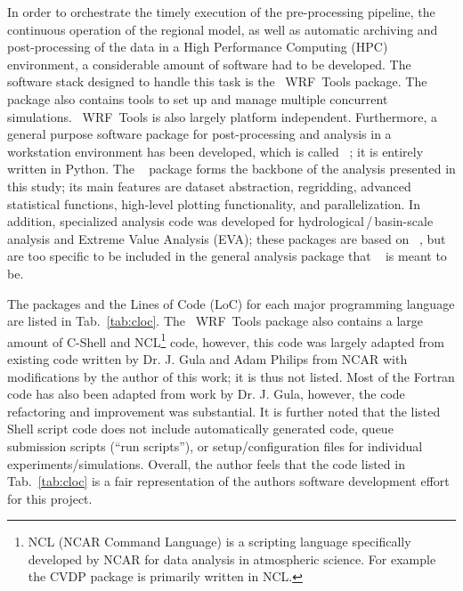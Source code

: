 \documentclass[letterpaper,12pt,headsepline,final]{scrartcl} %
\newcommand{\tab}[1]{Tab.~\ref{#1}}
\newcommand{\wrftools}{\mbox{\color{violet} \sffamily WRF~Tools}}
\newcommand{\geopy}{\mbox{\color{teal} \sffamily {GeoPy}}}
\begin{document}
In order to orchestrate the timely execution of the pre-processing pipeline, the continuous operation of the regional model, as well as automatic archiving and post-processing of the data in a High Performance Computing (HPC) environment, a considerable amount of software had to be developed. The software stack designed to handle this task is the \wrftools{} package.
The package also contains tools to set up and manage multiple concurrent simulations. \wrftools{} is also largely platform independent.
Furthermore, a general purpose software package for post-processing and analysis in a workstation environment has been developed, which is called \geopy{}; it is entirely written in Python. The \geopy{} package forms the backbone of the analysis presented in this study; its main features are dataset abstraction, regridding, advanced statistical functions, high-level plotting functionality, and parallelization.
In addition, specialized analysis code was developed for hydrological\,/\,basin-scale analysis and Extreme Value Analysis (EVA); these packages are based on \geopy{}, but are too specific to be included in the general analysis package that \geopy{} is meant to be.

The packages and the Lines of Code (LoC) for each major programming language are listed in \tab{tab:cloc}. The \wrftools{} package also contains a large amount of C-Shell and NCL\footnote{NCL (NCAR Command Language) is a scripting language specifically developed by NCAR for data analysis in atmospheric science. For example the CVDP package is primarily written in NCL.} code, however, this code was largely adapted from existing code written by Dr. J. Gula and Adam Philips from NCAR with modifications by the author of this work; it is thus not listed. Most of the Fortran code has also been adapted from work by Dr. J. Gula, however, the code refactoring and improvement was substantial.
It is further noted that the listed Shell script code does not include automatically generated code, queue submission scripts (``run scripts''), or setup/configuration files for individual experiments/simulations.
Overall, the author feels that the code listed in \tab{tab:cloc} is a fair representation of the authors software development effort for this project.
\end{document}
